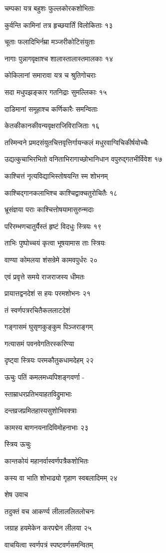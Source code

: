 चम्पका यत्र बहुशः फुल्लकोरकशोभिताः

कुर्वन्ति कामिनां तत्र हृच्छयार्तिं विलोकिताः १३

चूताः फलादिभिर्नम्रा मञ्जरीकोटिसंयुताः

नागाः पुन्नागवृक्षाश्च शालास्तालास्तमालकाः १४

कोकिलानां समारावा यत्र च श्रुतिगोचराः

सदा मधुपझङ्कार गतनिद्राः सुमल्लिकाः १५

दाडिमानां समूहाश्च कर्णिकारैः समन्विताः

केतकीकानकीवन्यवृक्षराजिविराजिताः १६

तस्मिन्वने प्रमदसंयुतचित्तवृत्तिर्गायन्कलं मधुरवाग्विचिकीर्षयोच्चैः

उद्यत्कुचाभिरभितो वनिताभिरागाच्छोभानिधान वपुरुद्गतभीर्विवेश १७

काश्चित्तं नृत्यविद्याभिस्तोषयन्ति स्म शोभनम्

काश्चिद्गानकलाभिश्च काश्चिद्वाक्चतुरोचितैः १८

भ्रूसंज्ञया पराः काश्चित्तोषयामासुरुन्मदाः

परिरम्भणचातुर्यैस्तं हृष्टं विदधुः स्त्रियः १९

ताभिः पुष्पोच्चयं कृत्वा भूषयामास ताः स्त्रियः

वाण्या कोमलया शंसन्रेमे कामवपुर्धरः २०

एवं प्रवृत्ते समये राजराजस्य धीमतः

प्रायात्तद्वनदेशं स हयः परमशोभनः २१

तं स्वर्णपत्ररचितैकललाटदेशं

गङ्गासमं घुसृणकुङ्कुम पिञ्जराङ्गम्

गत्यासमं पवनवेगतिरस्करिण्या

दृष्ट्वा स्त्रियः परमकौतुकधामदेहम् २२

ऊचुः पतिं कमलमध्यपिशङ्गवर्णा -

स्ताम्राधरप्रतिभयाहतविद्रुमाभाः

दन्तव्रजप्रमितहास्यसुशोभिवक्त्राः

कामस्य बाणनयनादिविमोहनाभाः २३

स्त्रिय ऊचुः

कान्तकोयं महानर्वास्वर्णपत्रैकशोभितः

कस्य वा भाति शोभाढ्यो गृहाण स्वबलादिमम् २४

शेष उवाच

तदुक्तं वच आकर्ण्य लीलाललितलोचनः

जग्राह हयमेकेन करपद्मेन लीलया २५

वाचयित्वा स्वर्णपत्रं स्पष्टवर्णसमन्वितम्

